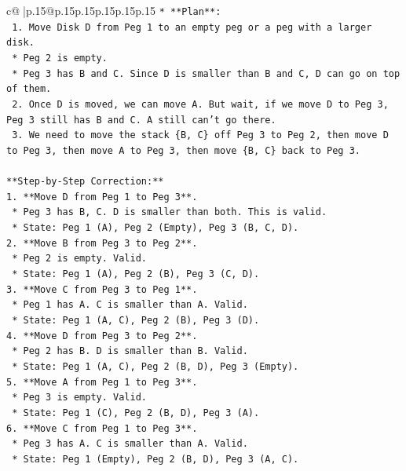 \documentclass{article}
\begin{document}
{\begin{supertabular}{c@{$\;$}|p{.15\linewidth}@{}p{.15\linewidth}p{.15\linewidth}p{.15\linewidth}p{.15\linewidth}p{.15\linewidth}}
{{{\texttt{*   **Plan**:} \\
\texttt{    1.  Move Disk D from Peg 1 to an empty peg or a peg with a larger disk.} \\
\texttt{        *   Peg 2 is empty.} \\
\texttt{        *   Peg 3 has B and C. Since D is smaller than B and C, D can go on top of them.} \\
\texttt{    2.  Once D is moved, we can move A. But wait, if we move D to Peg 3, Peg 3 still has B and C. A still can't go there.} \\
\texttt{    3.  We need to move the stack \{B, C\} off Peg 3 to Peg 2, then move D to Peg 3, then move A to Peg 3, then move \{B, C\} back to Peg 3.} \\
\\ 
\texttt{**Step{-}by{-}Step Correction:**} \\
\texttt{1.  **Move D from Peg 1 to Peg 3**.} \\
\texttt{    *   Peg 3 has B, C. D is smaller than both. This is valid.} \\
\texttt{    *   State: Peg 1 (A), Peg 2 (Empty), Peg 3 (B, C, D).} \\
\texttt{2.  **Move B from Peg 3 to Peg 2**.} \\
\texttt{    *   Peg 2 is empty. Valid.} \\
\texttt{    *   State: Peg 1 (A), Peg 2 (B), Peg 3 (C, D).} \\
\texttt{3.  **Move C from Peg 3 to Peg 1**.} \\
\texttt{    *   Peg 1 has A. C is smaller than A. Valid.} \\
\texttt{    *   State: Peg 1 (A, C), Peg 2 (B), Peg 3 (D).} \\
\texttt{4.  **Move D from Peg 3 to Peg 2**.} \\
\texttt{    *   Peg 2 has B. D is smaller than B. Valid.} \\
\texttt{    *   State: Peg 1 (A, C), Peg 2 (B, D), Peg 3 (Empty).} \\
\texttt{5.  **Move A from Peg 1 to Peg 3**.} \\
\texttt{    *   Peg 3 is empty. Valid.} \\
\texttt{    *   State: Peg 1 (C), Peg 2 (B, D), Peg 3 (A).} \\
\texttt{6.  **Move C from Peg 1 to Peg 3**.} \\
\texttt{    *   Peg 3 has A. C is smaller than A. Valid.} \\
\texttt{    *   State: Peg 1 (Empty), Peg 2 (B, D), Peg 3 (A, C).} \\
}}}
\end{supertabular}}
\end{document}
